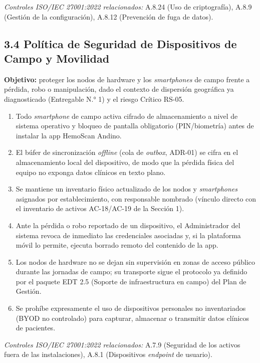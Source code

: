 \documentclass[11pt,a4paper]{article}
\providecommand{\tightlist}{%
  \setlength{\itemsep}{0pt}\setlength{\parskip}{0pt}}
\begin{document}
\emph{Controles ISO/IEC 27001:2022 relacionados:} A.8.24 (Uso de criptografía), A.8.9 (Gestión de la configuración), A.8.12 (Prevención de fuga de datos).

\subsection{3.4 Política de Seguridad de Dispositivos de Campo y Movilidad}\label{poluxedtica-de-seguridad-de-dispositivos-de-campo-y-movilidad}

\textbf{Objetivo:} proteger los nodos de hardware y los \emph{smartphones} de campo frente a pérdida, robo o manipulación, dado el contexto de dispersión geográfica ya diagnosticado (Entregable N.° 1) y el riesgo Crítico RS-05.

\begin{enumerate}
\def\labelenumi{\arabic{enumi}.}
\tightlist
\item
  Todo \emph{smartphone} de campo activa cifrado de almacenamiento a nivel de sistema operativo y bloqueo de pantalla obligatorio (PIN/biometría) antes de instalar la app HemoScan Andino.
\item
  El búfer de sincronización \emph{offline} (cola de \emph{outbox}, ADR-01) se cifra en el almacenamiento local del dispositivo, de modo que la pérdida física del equipo no exponga datos clínicos en texto plano.
\item
  Se mantiene un inventario físico actualizado de los nodos y \emph{smartphones} asignados por establecimiento, con responsable nombrado (vínculo directo con el inventario de activos AC-18/AC-19 de la Sección 1).
\item
  Ante la pérdida o robo reportado de un dispositivo, el Administrador del sistema revoca de inmediato las credenciales asociadas y, si la plataforma móvil lo permite, ejecuta borrado remoto del contenido de la app.
\item
  Los nodos de hardware no se dejan sin supervisión en zonas de acceso público durante las jornadas de campo; su transporte sigue el protocolo ya definido por el paquete EDT 2.5 (Soporte de infraestructura en campo) del Plan de Gestión.
\item
  Se prohíbe expresamente el uso de dispositivos personales no inventariados (BYOD no controlado) para capturar, almacenar o transmitir datos clínicos de pacientes.
\end{enumerate}

\emph{Controles ISO/IEC 27001:2022 relacionados:} A.7.9 (Seguridad de los activos fuera de las instalaciones), A.8.1 (Dispositivos \emph{endpoint} de usuario).
\end{document}
